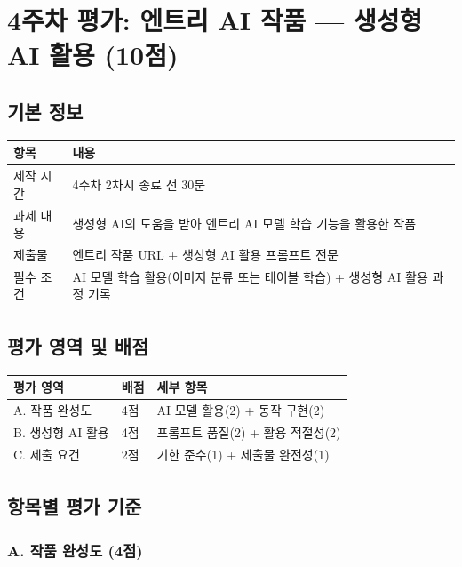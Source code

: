\documentclass[a4paper,11pt]{ltjsarticle}
\begin{document}
\section{4주차 평가: 엔트리 AI 작품 --- 생성형 AI 활용 (10점)}

\subsection{기본 정보}

\noindent
\begin{tabularx}{\textwidth}{|p{2.5cm}|X|}
\hline
\textbf{항목} & \textbf{내용} \\ \hline
제작 시간 & 4주차 2차시 종료 전 30분 \\ \hline
과제 내용 & 생성형 AI의 도움을 받아 엔트리 AI 모델 학습 기능을 활용한 작품 \\ \hline
제출물 & 엔트리 작품 URL + 생성형 AI 활용 프롬프트 전문 \\ \hline
필수 조건 & AI 모델 학습 활용(이미지 분류 또는 테이블 학습) + 생성형 AI 활용 과정 기록 \\ \hline
\end{tabularx}

\subsection{평가 영역 및 배점}

\noindent
\begin{tabularx}{\textwidth}{|X|>{\centering\arraybackslash}p{1.3cm}|X|}
\hline
\textbf{평가 영역} & \textbf{배점} & \textbf{세부 항목} \\ \hline
A. 작품 완성도 & 4점 & AI 모델 활용(2) + 동작 구현(2) \\ \hline
B. 생성형 AI 활용 & 4점 & 프롬프트 품질(2) + 활용 적절성(2) \\ \hline
C. 제출 요건 & 2점 & 기한 준수(1) + 제출물 완전성(1) \\ \hline
\end{tabularx}

\subsection{항목별 평가 기준}

\subsubsection{A. 작품 완성도 (4점)}
\end{document}
